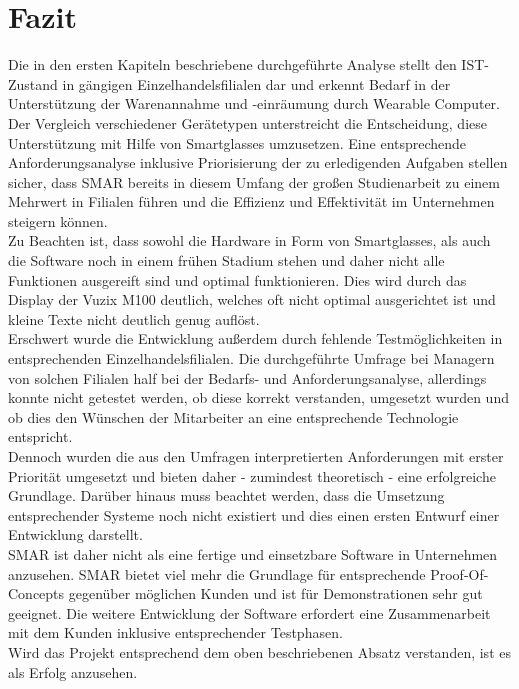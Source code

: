 \chapter{Fazit}
Die in den ersten Kapiteln beschriebene durchgeführte Analyse stellt den IST-Zustand in gängigen Einzelhandelsfilialen dar und erkennt Bedarf in der Unterstützung der Warenannahme und -einräumung durch Wearable Computer. Der Vergleich verschiedener Gerätetypen unterstreicht die Entscheidung, diese Unterstützung mit Hilfe von Smartglasses umzusetzen. Eine entsprechende Anforderungsanalyse inklusive Priorisierung der zu erledigenden Aufgaben stellen sicher, dass \ac{SMAR} bereits in diesem Umfang der großen Studienarbeit zu einem Mehrwert in Filialen führen und die Effizienz und Effektivität im Unternehmen steigern können.\\

Zu Beachten ist, dass sowohl die Hardware in Form von Smartglasses, als auch die Software noch in einem frühen Stadium stehen und daher nicht alle Funktionen ausgereift sind und optimal funktionieren. Dies wird \zB durch das Display der Vuzix M100 deutlich, welches oft nicht optimal ausgerichtet ist und kleine Texte nicht deutlich genug auflöst.\\

Erschwert wurde die Entwicklung außerdem durch fehlende Testmöglichkeiten in entsprechenden Einzelhandelsfilialen. Die durchgeführte Umfrage bei Managern von solchen Filialen half bei der Bedarfs- und Anforderungsanalyse, allerdings konnte nicht getestet werden, ob diese korrekt verstanden, umgesetzt wurden und ob dies den Wünschen der Mitarbeiter an eine entsprechende Technologie entspricht.\\

Dennoch wurden die aus den Umfragen interpretierten Anforderungen mit erster Priorität umgesetzt und bieten daher - zumindest theoretisch - eine erfolgreiche Grundlage. Darüber hinaus muss beachtet werden, dass die Umsetzung entsprechender Systeme noch nicht existiert und dies einen ersten Entwurf einer Entwicklung darstellt.\\

\ac{SMAR} ist daher nicht als eine fertige und einsetzbare Software in Unternehmen anzusehen. \ac{SMAR} bietet viel mehr die Grundlage für entsprechende Proof-Of-Concepts gegenüber möglichen Kunden und ist für Demonstrationen sehr gut geeignet. Die weitere Entwicklung der Software erfordert eine Zusammenarbeit mit dem Kunden inklusive entsprechender Testphasen.\\

Wird das Projekt entsprechend dem oben beschriebenen Absatz verstanden, ist es als Erfolg anzusehen.